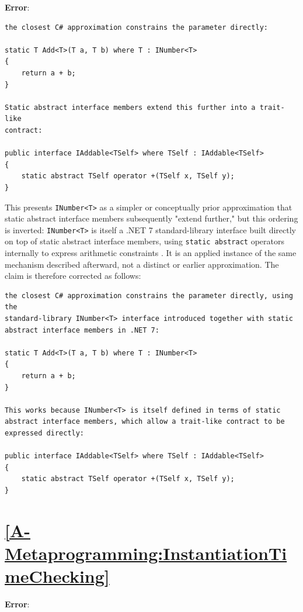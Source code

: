\documentclass[11pt]{report}
\begin{document}
\noindent\textbf{Error}:

\begin{Verbatim}[breaklines=true]
the closest C# approximation constrains the parameter directly:

static T Add<T>(T a, T b) where T : INumber<T>
{
    return a + b;
}

Static abstract interface members extend this further into a trait-like
contract:

public interface IAddable<TSelf> where TSelf : IAddable<TSelf>
{
    static abstract TSelf operator +(TSelf x, TSelf y);
}
\end{Verbatim}

This presents \texttt{INumber<T>} as a simpler or conceptually prior
approximation that static abstract interface members subsequently "extend
further," but this ordering is inverted: \texttt{INumber<T>} is itself a
.NET 7 standard-library interface built directly on top of static abstract
interface members, using \texttt{static abstract} operators internally to
express arithmetic constraints \cite{dotnetgenericmath}. It is an applied
instance of the same mechanism described afterward, not a distinct or
earlier approximation. The claim is therefore corrected as follows:

\begin{Verbatim}[breaklines=true]
the closest C# approximation constrains the parameter directly, using the
standard-library INumber<T> interface introduced together with static
abstract interface members in .NET 7:

static T Add<T>(T a, T b) where T : INumber<T>
{
    return a + b;
}

This works because INumber<T> is itself defined in terms of static
abstract interface members, which allow a trait-like contract to be
expressed directly:

public interface IAddable<TSelf> where TSelf : IAddable<TSelf>
{
    static abstract TSelf operator +(TSelf x, TSelf y);
}
\end{Verbatim}

\section*{\hyperref[A-Metaprogramming:InstantiationTimeChecking]{\ref*{A-Metaprogramming:InstantiationTimeChecking} }}
\noindent\textbf{Error}:
\end{document}
